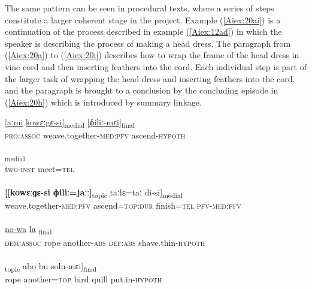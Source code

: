\documentclass[output=paper]{LSP/langsci}
\begin{document}
	The same pattern can be seen in procedural texts, where a series of steps constitute a larger coherent stage in the project. Example (\ref{Aiex:20ai}) is a continuation of the process described in example (\ref{Aiex:12ad}) in which the speaker is describing the process of making a head dress. The paragraph from (\ref{Aiex:20a}) to (\ref{Aiex:20i}) describes how to wrap the frame of the head dress in vine cord and then inserting feathers into the cord. Each individual step is part of the larger task of wrapping the head dress and inserting feathers into the cord, and the paragraph is brought to a conclusion by the concluding episode in (\ref{Aiex:20h}) which is introduced by summary linkage.
	\begin{exe}
\ex \label{Aiex:20ai}
\begin{xlist}
\ex \label{Aiex:20a}
\gll \underline{[aːmi}		\underline{kowɛːgɛ-si]}\textsubscript{medial}	\underline{[ɸiliː-mɛi]}\textsubscript{final}\\
\textsc{pro:assoc}	weave.together\textsc{-med:pfv}	ascend\textsc{-hypoth}\\
\glt {}\\
\ex \label{Aiex:20b}
\gll [aːnɛ-kɛi	ɡo=taː]\textsubscript{medial}\\
two-\textsc{inst}	meet\textsc{=tel}\\
\glt {}\\
\ex \label{Aiex:20c}
\gll	\textbf{[[kowɛːɡɛ-si} \textbf{ɸiliː=jaːː]}\textsubscript{topic}	taːlɛ=taː	di-si]\textsubscript{medial}\\
weave.together\textsc{-med:pfv}	ascend\textsc{=top:dur}		finish\textsc{=tel}	\textsc{pfv-med:pfv}\\
\glt {}\\
\ex \label{Aiex:20d}
\gll \underline{\smash{[aːmi}}	\underline{}	\underline{no-wa}	\underline{la}	\underline{\smash{gaːlɛ-mɛi]}}\textsubscript{final}\\
\textsc{dem:assoc}	rope	another\textsc{-abs}	\textsc{def:abs}	shave.thin\textsc{-hypoth}\\
\glt {}\\
\ex \label{Aiex:20e}
\gll [[mɛgi	no=wa]\textsubscript{topic}	abo	bu	solu-mɛi]\textsubscript{final}\\
rope	another\textsc{=top}	bird	quill	put.in\textsc{-hypoth}\\
\glt {}\\

\end{xlist}
\end{exe}
\end{document}
